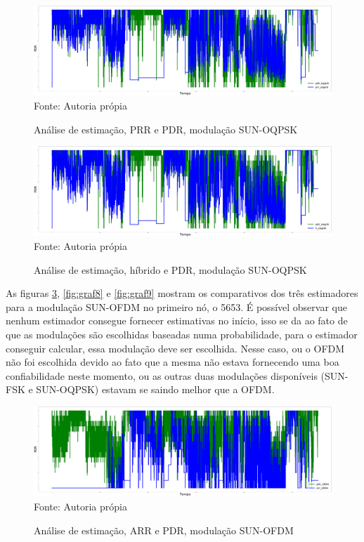\begin{figure}[H]
    \centering
    \caption{\footnotesize Análise de estimação, PRR e PDR, modulação SUN-OQPSK}
    \includegraphics[scale = 0.08]{sections/textual/Imagens/5653_prr_oqpsk.pdf}\\
    Fonte: Autoria própia
    \label{fig:graf5}
\end{figure}

\begin{figure}[H]
    \centering
    \caption{\footnotesize Análise de estimação, híbrido e PDR, modulação SUN-OQPSK}
    \includegraphics[scale = 0.08]{sections/textual/Imagens/5653_h_oqpsk.pdf}\\
    Fonte: Autoria própia
    \label{fig:graf6}
\end{figure}

As figuras \ref{fig:graf7}, \ref{fig:graf8} e \ref{fig:graf9} mostram os comparativos dos três estimadores para a modulação SUN-OFDM no primeiro nó, o 5653. É possível observar que nenhum estimador consegue fornecer estimativas no início, isso se da ao fato de que as modulações são escolhidas baseadas numa probabilidade, para o estimador conseguir calcular, essa modulação deve ser escolhida. Nesse caso, ou o OFDM não foi escolhida devido ao fato que a mesma não estava fornecendo uma boa confiabilidade neste momento, ou as outras duas modulações disponíveis (SUN-FSK e SUN-OQPSK) estavam se saindo melhor que a OFDM. 


\begin{figure}[H]
    \centering
    \caption{\footnotesize Análise de estimação, ARR e PDR, modulação SUN-OFDM}
    \includegraphics[scale = 0.08]{sections/textual/Imagens/5653_arr_ofdm.pdf}\\
    Fonte: Autoria própia
    \label{fig:graf7}
\end{figure}

